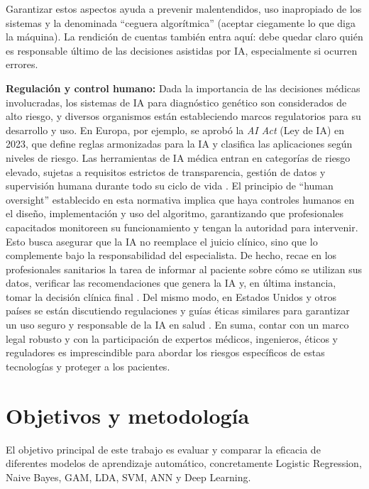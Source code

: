 \documentclass[11pt,a4paper,spanish]{book}
\numberwithin{equation}{chapter}
\numberwithin{figure}{chapter}
\begin{document}
Garantizar estos aspectos ayuda a prevenir malentendidos, uso inapropiado de los sistemas y la denominada ``ceguera algorítmica'' (aceptar ciegamente lo que diga la máquina). La rendición de cuentas también entra aquí: debe quedar claro quién es responsable último de las decisiones asistidas por IA, especialmente si ocurren errores\cite{rudin_2019,Libbrecht2015,Ginsburg_2018}.

\textbf{Regulación y control humano:} Dada la importancia de las decisiones médicas involucradas, los sistemas de IA para diagnóstico genético son considerados de alto riesgo, y diversos organismos están estableciendo marcos regulatorios para su desarrollo y uso. En Europa, por ejemplo, se aprobó la \textit{AI Act} (Ley de IA) en 2023,\cite{com2021laying,EC_AI_Act_2025} que define reglas armonizadas para la IA y clasifica las aplicaciones según niveles de riesgo.
Las herramientas de IA médica entran en categorías de riesgo elevado, sujetas a requisitos estrictos de transparencia, gestión de datos y supervisión humana durante todo su ciclo de vida .
El principio de ``human oversight'' establecido en esta normativa implica que haya controles humanos en el diseño, implementación y uso del algoritmo, garantizando que profesionales capacitados monitoreen su funcionamiento y tengan la autoridad para intervenir.
Esto busca asegurar que la IA no reemplace el juicio clínico, sino que lo complemente bajo la responsabilidad del especialista. De hecho, recae en los profesionales sanitarios la tarea de informar al paciente sobre cómo se utilizan sus datos, verificar las recomendaciones que genera la IA y, en última instancia, tomar la decisión clínica final . Del mismo modo, en Estados Unidos y otros países se están discutiendo regulaciones y guías éticas similares para garantizar un uso seguro y responsable de la IA en salud . En suma, contar con un marco legal robusto y con la participación de expertos médicos, ingenieros, éticos y reguladores es imprescindible para abordar los riesgos específicos de estas tecnologías y proteger a los pacientes.

\chapter{Objetivos y metodología}

El objetivo principal de este trabajo es evaluar y comparar la eficacia de diferentes modelos de aprendizaje automático, concretamente Logistic Regression, Naive Bayes, GAM, LDA, SVM, ANN y Deep Learning.
\end{document}
